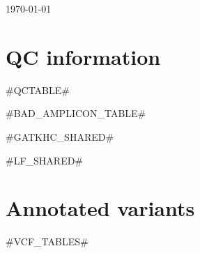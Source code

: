 \documentclass[11pt]{article}
\newcommand{\lightfont}{\fontseries{l}\selectfont}
\renewcommand{\arraystretch}{1.5}
\begin{document}
\begin{landscape}
\noindent
{\fontsize{16pt}{16pt}\selectfont {}}

\medskip
\noindent
{\lightfont \today}

%
\section{QC information}

\footnotesize
{{#QCTABLE#}}

\end{landscape}

\normalsize
{{#BAD_AMPLICON_TABLE#}}

\begin{landscape}

{{#GATKHC_SHARED#}}

{{#LF_SHARED#}}

\renewcommand{\arraystretch}{1.4}
\section{Annotated variants}
\footnotesize
{{#VCF_TABLES#}}

\end{landscape}
%
%
%
%
%

\end{document}
